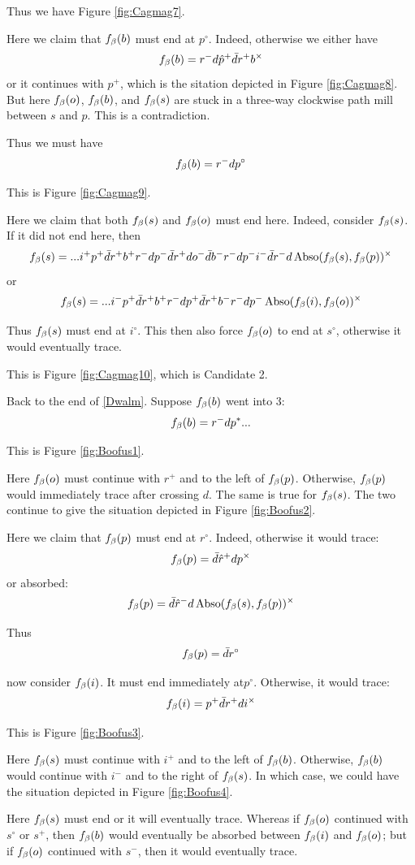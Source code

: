 Thus we have Figure \ref{fig:Cagmag7}.

Here we claim that $f_\beta(b)$ must end at $p^\circ$. Indeed, otherwise we either have
\[
f_\beta(b) = r^- d \hat{p}^+ \bar{d} r^+ b^\times
\]
or it continues with $p^+$, which is the sitation depicted in Figure \ref{fig:Cagmag8}. But here $f_\beta(o)$, $f_\beta(b)$, and $f_\beta(s)$ are stuck in a three-way clockwise path mill between $s$ and $p$. This is a contradiction.

Thus we must have
\[
f_\beta(b) = r^- d p^\circ
\]

This is Figure \ref{fig:Cagmag9}.

Here we claim that both $f_\beta(s)$ and $f_\beta(o)$ must end here. Indeed, consider $f_\beta(s)$. If it did not end here, then
\[
f_\beta(s) = ...i^+ p^+ \bar{d} r^+ b^+ r^- d p^- \bar{d} r^+ d o^- \bar{d} b^- r^- d p^- i^- \bar{d} r^- d \operatorname{Abso}(f_\beta(s), f_\beta(p))^\times
\]
or
\[
f_\beta(s) = ...i^- p^+ \bar{d} r^+ b^+ r^- d p^+ \bar{d} r^+ b^- r^- d p^- \operatorname{Abso}(f_\beta(i), f_\beta(o))^\times
\]

Thus $f_\beta(s)$ must end at $i^\circ$. This then also force $f_\beta(o)$ to end at $s^\circ$, otherwise it would eventually trace.

This is Figure \ref{fig:Cagmag10}, which is Candidate 2.

\label{Boofus}
Back to the end of \ref{Dwalm}. Suppose $f_\beta(b)$ went into 3:
\[
f_\beta(b) = r^- d p^*...
\]

This is Figure \ref{fig:Boofus1}.

Here $f_\beta(o)$ must continue with $r^+$ and to the left of $f_\beta(p)$. Otherwise, $f_\beta(p)$ would immediately trace after crossing $d$. The same is true for $f_\beta(s)$. The two continue to give the situation depicted in Figure \ref{fig:Boofus2}.

Here we claim that $f_\beta(p)$ must end at $r^\circ$. Indeed, otherwise it would trace:
\[
f_\beta(p) = \bar{d} \hat{r}^+ d p^\times
\]
or absorbed:
\[
f_\beta(p) = \bar{d} \hat{r}^- d \operatorname{Abso}(f_\beta(s), f_\beta(p))^\times
\]

Thus 
\[
f_\beta(p) = \bar{d} r^\circ
\]

now consider $f_\beta(i)$. It must end immediately at$p^\circ$. Otherwise, it would trace:
\[
f_\beta(i) = p^+ \bar{d} r^+ d i^\times
\]

This is Figure \ref{fig:Boofus3}.

Here $f_\beta(s)$ must continue with $i^+$ and to the left of $f_\beta(b)$. Otherwise, $f_\beta(b)$ would continue with $i^-$ and to the right of $f_\beta(s)$. In which case, we could have the situation depicted in Figure \ref{fig:Boofus4}.

Here $f_\beta(s)$ must end or it will eventually trace. Whereas if $f_\beta(o)$ continued with $s^\circ$ or $s^+$, then $f_\beta(b)$ would eventually be absorbed between $f_\beta(i)$ and $f_\beta(o)$; but if $f_\beta(o)$ continued with $s^-$, then it would eventually trace. 


